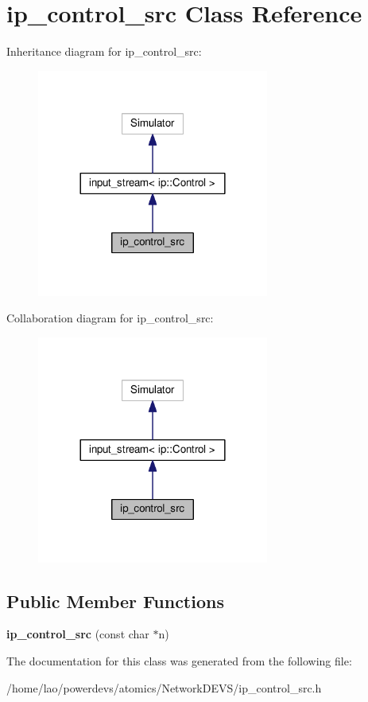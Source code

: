 \hypertarget{classip__control__src}{}\section{ip\+\_\+control\+\_\+src Class Reference}
\label{classip__control__src}


Inheritance diagram for ip\+\_\+control\+\_\+src\+:\nopagebreak
\begin{figure}[H]
\begin{center}
\leavevmode
\includegraphics[width=216pt]{classip__control__src__inherit__graph}
\end{center}
\end{figure}


Collaboration diagram for ip\+\_\+control\+\_\+src\+:\nopagebreak
\begin{figure}[H]
\begin{center}
\leavevmode
\includegraphics[width=216pt]{classip__control__src__coll__graph}
\end{center}
\end{figure}
\subsection*{Public Member Functions}
\begin{DoxyCompactItemize}
\item 
{\bfseries ip\+\_\+control\+\_\+src} (const char $\ast$n)\hypertarget{classip__control__src_a6046f82b5fd050f6ae6f24910f4a2a3c}{}\label{classip__control__src_a6046f82b5fd050f6ae6f24910f4a2a3c}

\end{DoxyCompactItemize}


The documentation for this class was generated from the following file\+:\begin{DoxyCompactItemize}
\item 
/home/lao/powerdevs/atomics/\+Network\+D\+E\+V\+S/ip\+\_\+control\+\_\+src.\+h\end{DoxyCompactItemize}
